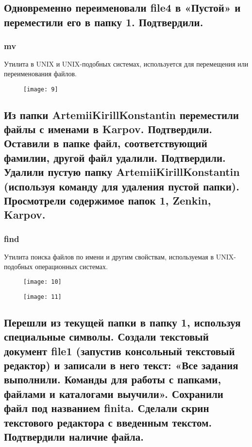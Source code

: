 \subsection{Одновременно переименовали file4 в «Пустой» и переместили его в папку 1. Подтвердили.}

\subsubsection{mv}
Утилита в UNIX и UNIX-подобных системах, используется для перемещения или переименования файлов.

\begin{figure}[H]
	\begin{center}
		\texttt{[image: 9]}
		\caption{} 
		\label{pic:pic_12} %
	\end{center}
\end{figure}

\newpage

\subsection{Из папки ArtemiiKirillKonstantin переместили файлы с именами в Karpov. Подтвердили. Оставили в папке файл, соответствующий фамилии, другой файл удалили.  Подтвердили. Удалили пустую папку ArtemiiKirillKonstantin (используя команду для удаления пустой папки). Просмотрели содержимое папок 1, Zenkin, Karpov.}

\subsubsection{find}
Утилита поиска файлов по имени и другим свойствам, используемая в UNIX-подобных операционных системах.
\begin{figure}[H]
	\begin{center}
		\texttt{[image: 10]}
		\caption{} 
		\label{pic:pic_13} %
	\end{center}
\end{figure}

\begin{figure}[H]
	\begin{center}
		\texttt{[image: 11]}
		\caption{} 
		\label{pic:pic_14} %
	\end{center}
\end{figure}

\subsection{Перешли из текущей папки в папку 1, используя специальные символы. Создали текстовый документ file1 (запустив консольный текстовый редактор) и записали в него текст: «Все задания выполнили. Команды для работы с папками, файлами и каталогами выучили». Сохранили файл под названием finita. Сделали скрин текстового редактора с введенным текстом. Подтвердили наличие файла.}

